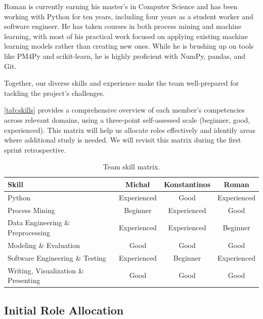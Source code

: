 \documentclass[runningheads]{llncs}
\begin{document}
Roman is currently earning his master's in Computer Science and has been working with Python for ten years, including four years as a student worker and software engineer. He has taken courses in both process mining and machine learning, with most of his practical work focused on applying existing machine learning models rather than creating new ones. While he is brushing up on tools like PM4Py and scikit-learn, he is highly proficient with NumPy, pandas, and Git.

Together, our diverse skills and experience make the team well-prepared for tackling the project's challenges.

\autoref{tab:skills} provides a comprehensive overview of each member's competencies across relevant domains, using a three-point self-assessed scale (beginner, good, experienced). This matrix will help us allocate roles effectively and identify areas where additional study is needed. We will revisit this matrix during the first sprint retrospective.




\begin{table}[H]
    \caption{Team skill matrix.}\label{tab:skills}
    \centering
    \begin{tabular}{@{}lccc@{}}
        \toprule
        \textbf{Skill}                       & \textbf{Michał} & \textbf{Konstantinos} & \textbf{Roman} \\
        \midrule
        Python                               & Experienced     & Good                  & Experienced    \\
        Process Mining                       & Beginner        & Experienced           & Good           \\
        Data Engineering \& Preprocessing    & Experienced     & Experienced           & Beginner       \\
        Modeling \& Evaluation               & Good            & Good                  & Good           \\
        Software Engineering \& Testing      & Experienced     & Beginner              & Experienced    \\
        Writing, Visualization \& Presenting & Good            & Good                  & Good           \\
        \bottomrule
    \end{tabular}
\end{table}

\subsection{Initial Role Allocation}
\end{document}
